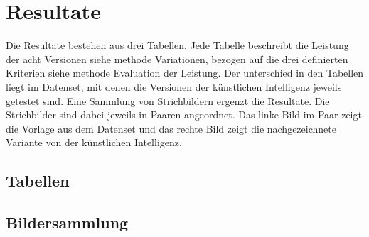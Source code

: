 \chapter{Resultate}
Die Resultate bestehen aus drei Tabellen. Jede Tabelle beschreibt die Leistung
der acht Versionen {siehe methode Variationen}, bezogen auf die drei definierten
Kriterien {siehe methode Evaluation der Leistung}. Der unterschied in den
Tabellen liegt im Datenset, mit denen die Versionen der künstlichen Intelligenz
jeweils getestet sind.
Eine Sammlung von Strichbildern ergenzt die Resultate. Die Strichbilder sind
dabei jeweils in Paaren angeordnet. Das linke Bild im Paar zeigt die Vorlage aus
dem Datenset und das rechte Bild zeigt die nachgezeichnete Variante von der
künstlichen Intelligenz.

\section{Tabellen}


\section{Bildersammlung}
